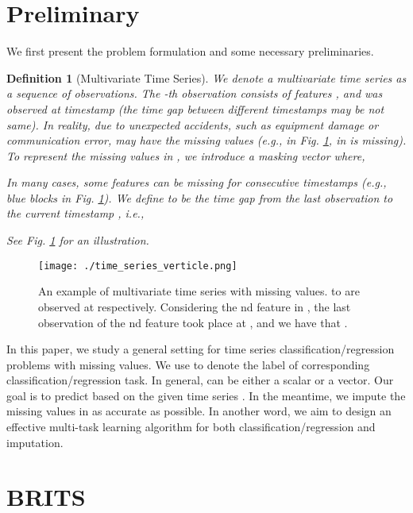 \documentclass{article}
\newcommand{\methodname}{\xspace{BRITS}}
\newtheorem{definition}{Definition}
\begin{document}
%
 \section{Preliminary}

We first present the problem formulation and some necessary preliminaries.

\begin{definition}[Multivariate Time Series] We denote a multivariate time series  as a sequence of  observations. The -th observation  consists of  features , and was observed at timestamp   (the time gap between different timestamps may  be not same).  In reality, due to unexpected accidents, such as equipment damage or communication error,  may have the missing values (e.g., in Fig. \ref{fig:time_series},  in  is missing). To represent the missing values in , we introduce a {\em masking vector}  where, 

In many cases, some features can be missing for consecutive timestamps (e.g., blue blocks in Fig. \ref{fig:time_series}). We define  to be the time gap from the last observation to the current timestamp , i.e., 


See Fig. \ref{fig:time_series} for an illustration.
\end{definition}


\begin{figure}[ht]
\centering
\texttt{[image: ./time\_series\_verticle.png]}
\caption{An example of multivariate time series with missing values.  to  are observed at  respectively. Considering the nd feature in , the last observation of the nd feature took place at , and we have that .}
\label{fig:time_series}
\end{figure}


In this paper, we study a general setting for time series classification/regression problems with missing values. We use  to denote the label of corresponding classification/regression task. In general,  can be either a scalar or a vector. Our goal is to predict  based on the given time series . In the meantime, we impute the missing values in  as accurate as possible. In another word, we aim to design an effective multi-task learning algorithm for both classification/regression and imputation.
 \section{\methodname}
\label{sec:feature_independent}
\end{document}
